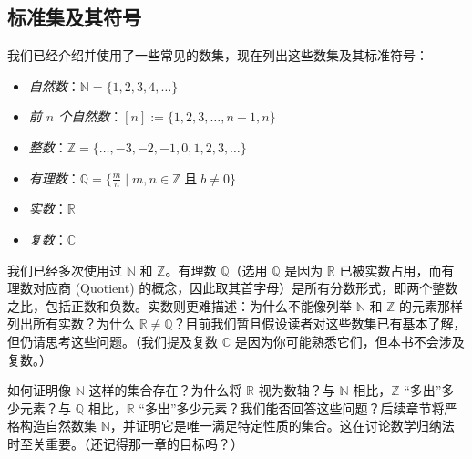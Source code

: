 \subsection{标准集及其符号}

我们已经介绍并使用了一些常见的数集，现在列出这些数集及其标准符号：

\begin{center}
\begin{itemize}
    \item \emph{自然数}：$\mathbb{N} = \{1, 2, 3, 4, \dots \}$
    \item \emph{前 $n$ 个自然数}：$[n] := \{1, 2, 3, \dots , n-1, n \}$
    \item \emph{整数}：$\mathbb{Z} = \{\dots, -3, -2, -1, 0, 1, 2, 3, \dots \}$
    \item \emph{有理数}：$\mathbb{Q} = \{\frac{m}{n} \mid m,n \in \mathbb{Z} \;\text{且}\; b \ne 0 \}$
    \item \emph{实数}：$\mathbb{R}$
    \item \emph{复数}：$\mathbb{C}$
\end{itemize}
\end{center}

我们已经多次使用过 $\mathbb{N}$ 和 $\mathbb{Z}$。有理数 $\mathbb{Q}$（选用 $\mathbb{Q}$ 是因为 $\mathbb{R}$ 已被实数占用，而有理数对应商 (Quotient) 的概念，因此取其首字母）是所有分数形式，即两个整数之比，包括正数和负数。实数则更难描述：为什么不能像列举 $\mathbb{N}$ 和 $\mathbb{Z}$ 的元素那样列出所有实数？为什么 $\mathbb{R} \ne \mathbb{Q}$？目前我们暂且假设读者对这些数集已有基本了解，但仍请思考这些问题。（我们提及复数 $\mathbb{C}$ 是因为你可能熟悉它们，但本书不会涉及复数。）

如何证明像 $\mathbb{N}$ 这样的集合存在？为什么将 $\mathbb{R}$ 视为数轴？与 $\mathbb{N}$ 相比，$\mathbb{Z}$ ``多出''多少元素？与 $\mathbb{Q}$ 相比，$\mathbb{R}$ ``多出''多少元素？我们能否回答这些问题？后续章节将严格构造自然数集 $\mathbb{N}$，并证明它是唯一满足特定性质的集合。这在讨论数学归纳法时至关重要。（还记得那一章的目标吗？）
